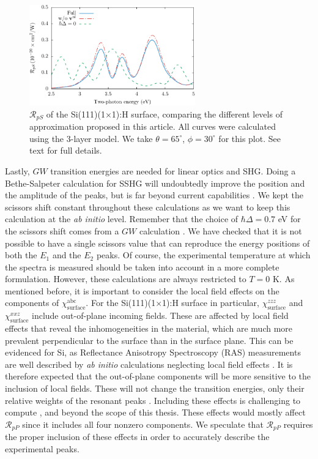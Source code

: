 \begin{figure}[t]
\centering
\includegraphics[width=0.64\textwidth]
{content/figures/fig-Si1x1-Mejia_RpS_improvements}
\caption[$\mathcal{R}_{pS}$ calculated with different levels of appoximation.]
{$\mathcal{R}_{pS}$ of the Si(111)(1$\times$1):H surface, comparing the
different levels of approximation proposed in this article. All curves were
calculated using the 3-layer model. We take $\theta=65^{\circ}$,
$\phi=30^{\circ}$ for this plot. See text for full details.}
\label{fig:improvements}
\end{figure}

Lastly, $GW$ transition energies are needed for linear optics and SHG. Doing a
Bethe-Salpeter calculation for SSHG will undoubtedly improve the position and
the amplitude of the peaks, but is far beyond current capabilities \cite{puff}.
We kept the scissors shift constant throughout these calculations as we want to
keep this calculation at the {\em ab initio} level. Remember that the choice of
$\hbar\Delta=0.7$ eV for the scissors shift comes from a $GW$ calculation
\cite{liPRB10}. We have checked that it is not possible to have a single
scissors value that can reproduce the energy positions of both the $E_{1}$ and
the $E_{2}$ peaks. Of course, the experimental temperature at which the spectra
is measured should be taken into account in a more complete formulation.
However, these calculations are always restricted to $T=0$ K. As mentioned
before, it is important to consider the local field effects on the components of
$\chi^{\mathrm{abc}}_{\mathrm{surface}}$. For the Si(111)(1$\times$1):H surface
in particular, $\chi^{zzz}_{\mathrm{surface}}$ and
$\chi^{xxz}_{\mathrm{surface}}$ include out-of-plane incoming fields. These are
affected by local field effects \cite{tancognedejean:tel-01235611} that reveal
the inhomogeneities in the material, which are much more prevalent perpendicular
to the surface than in the surface plane. This can be evidenced for Si, as
Reflectance Anisotropy Spectroscopy (RAS) measurements are well described by
\emph{ab initio} calculations neglecting local field effects \cite{palummoPRB99,
gaalPRB09}. It is therefore expected that the out-of-plane components will be
more sensitive to the inclusion of local fields. These will not change the
transition energies, only their relative weights of the resonant peaks
\cite{tancognedejean:tel-01235611}. Including these effects is challenging to
compute \cite{nicolasPRB15}, and beyond the scope of this thesis. These effects
would mostly affect $\mathcal{R}_{pP}$ since it includes all four nonzero
components. We speculate that $\mathcal{R}_{pP}$ requires the proper inclusion
of these effects in order to accurately describe the experimental peaks.


